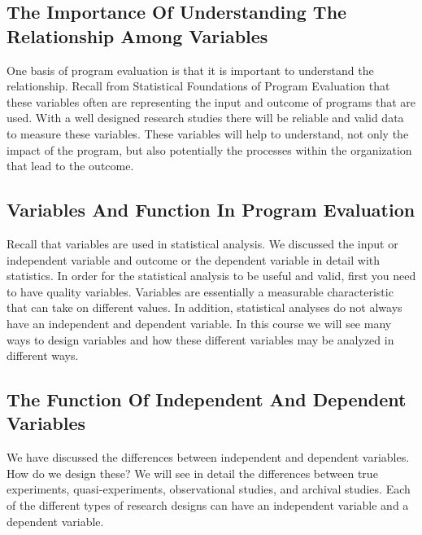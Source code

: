 \documentclass[]{book}
\theoremstyle{definition}
\theoremstyle{definition}
\theoremstyle{definition}
\theoremstyle{remark}
\begin{document}
\hypertarget{the-importance-of-understanding-the-relationship-among-variables}{%
\subsection{The Importance Of Understanding The Relationship Among
Variables}\label{the-importance-of-understanding-the-relationship-among-variables}}

One basis of program evaluation is that it is important to understand
the relationship. Recall from Statistical Foundations of Program
Evaluation that these variables often are representing the input and
outcome of programs that are used. With a well designed research studies
there will be reliable and valid data to measure these variables. These
variables will help to understand, not only the impact of the program,
but also potentially the processes within the organization that lead to
the outcome.

\hypertarget{variables-and-function-in-program-evaluation}{%
\subsection{Variables And Function In Program
Evaluation}\label{variables-and-function-in-program-evaluation}}

Recall that variables are used in statistical analysis. We discussed the
input or independent variable and outcome or the dependent variable in
detail with statistics. In order for the statistical analysis to be
useful and valid, first you need to have quality variables. Variables
are essentially a measurable characteristic that can take on different
values. In addition, statistical analyses do not always have an
independent and dependent variable. In this course we will see many ways
to design variables and how these different variables may be analyzed in
different ways.

\hypertarget{the-function-of-independent-and-dependent-variables}{%
\subsection{The Function Of Independent And Dependent
Variables}\label{the-function-of-independent-and-dependent-variables}}

We have discussed the differences between independent and dependent
variables. How do we design these? We will see in detail the differences
between true experiments, quasi-experiments, observational studies, and
archival studies. Each of the different types of research designs can
have an independent variable and a dependent variable.
\end{document}
